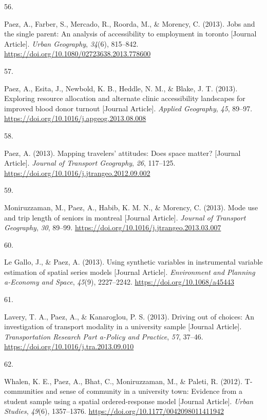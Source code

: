 \documentclass[11pt,a4paper,]{awesome-cv}
\newlength{\csllabelwidth}
\newcommand{\CSLLeftMargin}[1]{\parbox[t]{\csllabelwidth}{#1}}
\newcommand{\CSLRightInline}[1]{\parbox[t]{\linewidth - \csllabelwidth}{#1}}
\begin{document}
\leavevmode{}%
\CSLLeftMargin{56. }
\CSLRightInline{Paez, A., Farber, S., Mercado, R., Roorda, M., \&
Morency, C. (2013). Jobs and the single parent: An analysis of
accessibility to employment in toronto {[}Journal Article{]}.
\emph{Urban Geography}, \emph{34}(6), 815--842.
\url{https://doi.org/10.1080/02723638.2013.778600}}

\leavevmode{}%
\CSLLeftMargin{57. }
\CSLRightInline{Paez, A., Esita, J., Newbold, K. B., Heddle, N. M., \&
Blake, J. T. (2013). Exploring resource allocation and alternate clinic
accessibility landscapes for improved blood donor turnout {[}Journal
Article{]}. \emph{Applied Geography}, \emph{45}, 89--97.
\url{https://doi.org/10.1016/j.apgeog.2013.08.008}}

\leavevmode{}%
\CSLLeftMargin{58. }
\CSLRightInline{Paez, A. (2013). Mapping travelers' attitudes: Does
space matter? {[}Journal Article{]}. \emph{Journal of Transport
Geography}, \emph{26}, 117--125.
\url{https://doi.org/10.1016/j.jtrangeo.2012.09.002}}

\leavevmode{}%
\CSLLeftMargin{59. }
\CSLRightInline{Moniruzzaman, M., Paez, A., Habib, K. M. N., \& Morency,
C. (2013). Mode use and trip length of seniors in montreal {[}Journal
Article{]}. \emph{Journal of Transport Geography}, \emph{30}, 89--99.
\url{https://doi.org/10.1016/j.jtrangeo.2013.03.007}}

\leavevmode{}%
\CSLLeftMargin{60. }
\CSLRightInline{Le Gallo, J., \& Paez, A. (2013). Using synthetic
variables in instrumental variable estimation of spatial series models
{[}Journal Article{]}. \emph{Environment and Planning a-Economy and
Space}, \emph{45}(9), 2227--2242. \url{https://doi.org/10.1068/a45443}}

\leavevmode{}%
\CSLLeftMargin{61. }
\CSLRightInline{Lavery, T. A., Paez, A., \& Kanaroglou, P. S. (2013).
Driving out of choices: An investigation of transport modality in a
university sample {[}Journal Article{]}. \emph{Transportation Research
Part a-Policy and Practice}, \emph{57}, 37--46.
\url{https://doi.org/10.1016/j.tra.2013.09.010}}

\leavevmode{}%
\CSLLeftMargin{62. }
\CSLRightInline{Whalen, K. E., Paez, A., Bhat, C., Moniruzzaman, M., \&
Paleti, R. (2012). T-communities and sense of community in a university
town: Evidence from a student sample using a spatial ordered-response
model {[}Journal Article{]}. \emph{Urban Studies}, \emph{49}(6),
1357--1376. \url{https://doi.org/10.1177/0042098011411942}}
\end{document}
